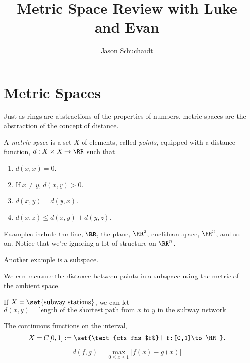 \documentclass{article}
\title{Metric Space Review with Luke and Evan}
\author{Jason Schuchardt}
\begin{document}
\maketitle

\section{Metric Spaces}

Just as rings are abstractions of the properties of numbers, metric spaces are the abstraction of
the concept of distance.

\begin{definition}
    A \emph{metric space} is a set $X$ of elements, called \emph{points}, equipped with a 
    distance function, $d:X\times X\to \RR$ such that
    \begin{enumerate}[1]
        \item $d(x,x)=0$.
        \item If $x\ne y$, $d(x,y)>0$.
        \item $d(x,y)=d(y,x)$.
        \item $d(x,z) \le d(x,y)+d(y,z)$.
    \end{enumerate}
\end{definition}

\begin{example}
Examples include the line, $\RR$, the plane, $\RR^2$, euclidean space, $\RR^3$, and so on.
Notice that we're ignoring a lot of structure on $\RR^n$.
\end{example}

\begin{example}
Another example is a subspace.

We can measure the distance between points in a subspace using the metric of the ambient space.
\end{example}

\begin{example}
    If $X=\set{\text{subway stations}}$, we can let
     $d(x,y)=\text{length of the shortest path from $x$ to $y$ in the subway network}$
\end{example}

\begin{example}
    The continuous functions on the interval,
    \[ X=C[0,1]:=\set{\text{cts fns $f$}| f:[0,1]\to \RR}.\]

    \[ d(f,g) = \max_{0\le x\le 1} |f(x)-g(x)|\]
\end{example}
\end{document}
